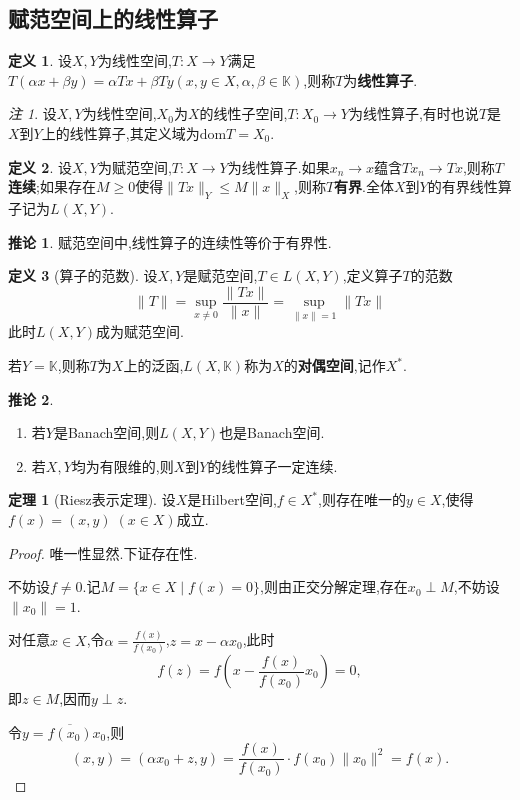 \documentclass{ctexart}
\theoremstyle{definition}
\newtheorem{definition}{定义}
\newtheorem{theorem}{定理}
\newtheorem{corollary}{推论}
\theoremstyle{remark}
\newtheorem*{remark}{注}
\begin{document}
	\subsection{赋范空间上的线性算子}
	
	\begin{definition}
		设$X,Y$为线性空间,$T:X\to Y$满足$T(\alpha x+\beta y)=\alpha Tx+\beta Ty(x,y\in X,\alpha,\beta\in\mathbb{K})$,则称$T$为\textbf{线性算子}.
	\end{definition}
	\begin{remark}
		设$X,Y$为线性空间,$X_0$为$X$的线性子空间,$T:X_0\to Y$为线性算子,有时也说$T$是$X$到$Y$上的线性算子,其定义域为$\mathrm{dom}T=X_0$.
	\end{remark}
	\begin{definition}
		设$X,Y$为赋范空间,$T:X\to Y$为线性算子.如果$x_n\to x$蕴含$Tx_n\to Tx$,则称$T$\textbf{连续};如果存在$M\ge 0$使得$\|Tx\|_Y\le M\|x\|_X$,则称$T$\textbf{有界}.全体$X$到$Y$的有界线性算子记为$L(X,Y)$.
	\end{definition}
	\begin{corollary}
		赋范空间中,线性算子的连续性等价于有界性.
	\end{corollary}
	\begin{definition}[算子的范数]
		设$X,Y$是赋范空间,$T\in L(X,Y)$,定义算子$T$的范数
		$$\|T\|=\sup_{x\ne 0}\frac{\|Tx\|}{\|x\|}=\sup_{\|x\|=1}{\|Tx\|}$$
		此时$L(X,Y)$成为赋范空间.
		
		若$Y=\mathbb{K}$,则称$T$为$X$上的泛函,$L(X,\mathbb{K})$称为$X$的\textbf{对偶空间},记作$X^*$.
	\end{definition}
	\begin{corollary}
		\begin{enumerate}
			\item 若$Y$是Banach空间,则$L(X,Y)$也是Banach空间.
			\item 若$X,Y$均为有限维的,则$X$到$Y$的线性算子一定连续.
		\end{enumerate}
	\end{corollary}
	
	\begin{theorem}[Riesz表示定理]
		设$X$是Hilbert空间,$f\in X^*$,则存在唯一的$y\in X$,使得$f(x)=(x,y)\;(x\in X)$成立.
	\end{theorem}
	\begin{proof}
		唯一性显然.下证存在性.
		
		不妨设$f\ne 0$.记$M=\{x\in X\mid f(x)=0\}$,则由正交分解定理,存在$x_0\perp M$,不妨设$\|x_0\|=1$.
		
		对任意$x\in X$,令$\alpha=\frac{f(x)}{f(x_0)}$,$z=x-\alpha x_0$,此时
		$$f(z)=f\left(x-\frac{f(x)}{f(x_0)}x_0\right)=0,$$
		即$z\in M$,因而$y\perp z$.
		
		令$y=\overline{f(x_0)}x_0$,则
		$$(x,y)=(\alpha x_0+z,y)=\frac{f(x)}{f(x_0)}\cdot f(x_0)\|x_0\|^2=f(x).$$
	\end{proof}
	
\end{document}
